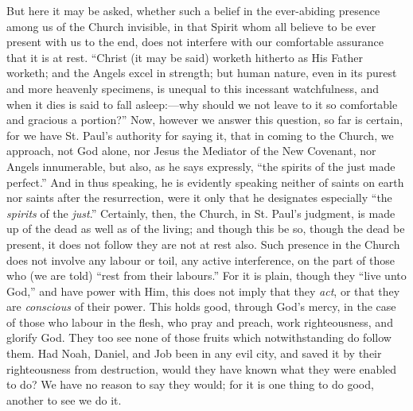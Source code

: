 But here it may be asked, whether such a belief in the ever-abiding
presence among us of the Church invisible, in that Spirit whom all
believe to be ever present with us to the end, does not interfere with
our comfortable assurance that it is at rest. ``Christ (it may be
said) worketh hitherto as His Father worketh; and the Angels excel in
strength; but human nature, even in its purest and more heavenly
specimens, is unequal to this incessant watchfulness, and when it dies
is said to fall asleep:—why should we not leave to it so comfortable
and gracious a portion?'' Now, however we answer this question, so
far is certain, for we have St. Paul's authority for saying it, that
in coming to the Church, we approach, not God alone, nor Jesus the
Mediator of the New Covenant, nor Angels innumerable, but also, as he
says expressly, ``the spirits of the just made perfect.'' And
in thus speaking, he is evidently speaking neither of saints on earth
nor saints after the resurrection, were it only that he designates
especially ``the \emph{spirits} of the \emph{just}.''
Certainly, then, the Church, in St. Paul's judgment, is made up of the
dead as well as of the living; and though this be so, though the dead
be present, it does not follow they are not at rest also. Such
presence in the Church does not involve any labour or toil, any active
interference, on the part of those who (we are told) ``rest from
their labours.'' For it is plain, though they ``live unto
God,'' and have power with Him, this does not imply that they \emph{act},
or that they are \emph{conscious} of their power. This holds good,
through God's mercy, in the case of those who labour in the flesh, who
pray and preach, work righteousness, and glorify God. They too see
none of those fruits which notwithstanding do follow them. Had Noah,
Daniel, and Job been in any evil city, and saved it by their
righteousness from destruction, would they have known what they were
enabled to do? We have no reason to say they would; for it is one
thing to do good, another to see we do it.

